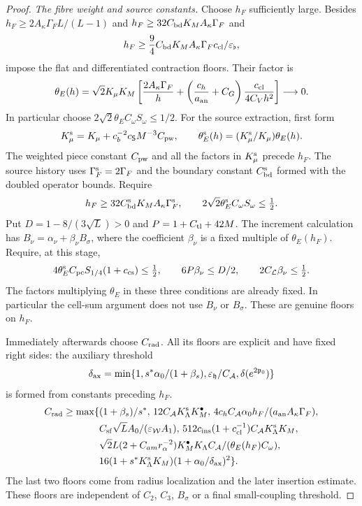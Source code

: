 \documentclass[11pt,letterpaper,reqno]{amsart}
\theoremstyle{definition}
\theoremstyle{remark}
\begin{document}
\begin{proof}
\emph{The fibre weight and source constants.}
Choose $h_F$ sufficiently large. Besides
$h_F\ge2A_\kappa\Gamma_FL/(L-1)$ and
$h_F\ge32C_{\rm bd}K_MA_\kappa\Gamma_F$ and
\[
 h_F\ge\frac94 C_{\rm bd}K_MA_\kappa\Gamma_F
                      c_{\rm cl}/\varepsilon_\flat,
\]
impose the flat and differentiated contraction floors. Their factor is
\[
 \theta_E(h)=\sqrt2K_\mu K_M
 \left[\frac{2A_\kappa\Gamma_F}h+
 \left(\frac{c_h}{a_{\rm an}}+C_G\right)
                         \frac{c_{\rm cl}}{4C_Vh^2}\right]
 \longrightarrow0.
\]
In particular choose $2\sqrt2\theta_EC_\omega S_\omega\le1/2$.
For the source extraction, first form
\[
 K_\mu^{\rm s}=K_\mu+c_b^{-2}c_{\mathsf S}M^{-3}C_{\rm pw},
 \qquad \theta_E^{\rm s}(h)=(K_\mu^{\rm s}/K_\mu)\theta_E(h).
\]
The weighted piece constant $C_{\rm pw}$ and all the factors
in $K_\mu^{\rm s}$ precede $h_F$. The source history uses
$\Gamma_F^{\rm s}=2\Gamma_F$ and the boundary constant
$C_{\rm bd}^{\rm s}$ formed with the doubled operator bounds.
Require
\[
 h_F\ge32C_{\rm bd}^{\rm s}K_MA_\kappa\Gamma_F^{\rm s},
 \qquad 2\sqrt2\theta_E^{\rm s}C_\omega S_\omega\le\tfrac12.
\]
Put $D=1-8/(3\sqrt L)>0$ and $P=1+C_{\rm tl}+42M$.
The increment calculation has
$B_\nu=\alpha_\nu+\beta_\nu B_\sigma$, where the coefficient
$\beta_\nu$ is a fixed multiple of $\theta_E(h_F)$.
Require, at this stage,
\[
 4\theta_E^{\rm s} C_{\rm pc}S_{1/4}(1+c_{\rm cs})\le\tfrac12,
 \qquad 6P\beta_\nu\le D/2,
 \qquad 2C_{\mathcal L}\beta_\nu\le\tfrac12.
\]
The factors multiplying $\theta_E$ in these three conditions
are already fixed. In particular the cell-sum argument
does not use $B_\nu$ or $B_\sigma$. These are genuine floors
on $h_F$.

Immediately afterwards choose $C_{\rm rad}$. All its floors
are explicit and have fixed right sides:
the auxiliary threshold
\[
 \delta_{\rm ax}=\min\{1,s^*\alpha_0/(1+\beta_s),
              \varepsilon_{\mathfrak h}/C_{\mathcal A},
              \delta(e^{2\mathfrak p_0})\}
\]
is formed from constants preceding $h_F$.
\[
\begin{split}
 C_{\rm rad}\ge\max\{& (1+\beta_s)/s^*,\,
 12C_{\mathcal A}K_\Lambda^{\rm s}K_M^\bullet,\,
 4c_h C_{\mathcal A}\alpha_0h_F/(a_{\rm an}A_\kappa\Gamma_F),\\
 &C_{\rm sf}\sqrt L A_0/(\varepsilon_{\mathcal W}A_1),\,
 512c_{\rm ins}(1+c_{\rm cl}^{-1})C_{\mathcal A}K_\Lambda^{\rm s}K_M,\\
 &\sqrt2L(2+C_{am}r_\alpha^{-2})K_M^\bullet K_\Lambda C_{\mathcal A}
                                  /(\theta_E(h_F)C_\omega),\\
 &16(1+s^*K_\Lambda^{\rm s}K_M)(1+\alpha_0/\delta_{\rm ax})^2\}.
\end{split}
\]
The last two floors come from radius localization and the
later insertion estimate. These floors are independent of $C_2$, $C_3$, $B_\sigma$
or a final small-coupling threshold.


\end{proof}
\end{document}
